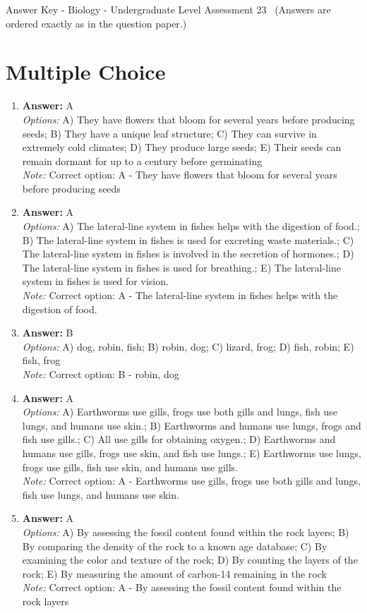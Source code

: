 \documentclass[12pt]{article}
\begin{document}
\begin{center}
Answer Key - Biology - Undergraduate Level Assessment 23 \
\small (Answers are ordered exactly as in the question paper.)
\end{center}

\section*{Multiple Choice}
\begin{enumerate}[label=\arabic*.]
\item \textbf{Answer:} A
\\ \textit{Options:} A) They have flowers that bloom for several years before producing seeds; B) They have a unique leaf structure; C) They can survive in extremely cold climates; D) They produce large seeds; E) Their seeds can remain dormant for up to a century before germinating
\\ \textit{Note:} Correct option: A - They have flowers that bloom for several years before producing seeds
\item \textbf{Answer:} A
\\ \textit{Options:} A) The lateral-line system in fishes helps with the digestion of food.; B) The lateral-line system in fishes is used for excreting waste materials.; C) The lateral-line system in fishes is involved in the secretion of hormones.; D) The lateral-line system in fishes is used for breathing.; E) The lateral-line system in fishes is used for vision.
\\ \textit{Note:} Correct option: A - The lateral-line system in fishes helps with the digestion of food.
\item \textbf{Answer:} B
\\ \textit{Options:} A) dog, robin, fish; B) robin, dog; C) lizard, frog; D) fish, robin; E) fish, frog
\\ \textit{Note:} Correct option: B - robin, dog
\item \textbf{Answer:} A
\\ \textit{Options:} A) Earthworms use gills, frogs use both gills and lungs, fish use lungs, and humans use skin.; B) Earthworms and humans use lungs, frogs and fish use gills.; C) All use gills for obtaining oxygen.; D) Earthworms and humans use gills, frogs use skin, and fish use lungs.; E) Earthworms use lungs, frogs use gills, fish use skin, and humans use gills.
\\ \textit{Note:} Correct option: A - Earthworms use gills, frogs use both gills and lungs, fish use lungs, and humans use skin.
\item \textbf{Answer:} A
\\ \textit{Options:} A) By assessing the fossil content found within the rock layers; B) By comparing the density of the rock to a known age database; C) By examining the color and texture of the rock; D) By counting the layers of the rock; E) By measuring the amount of carbon-14 remaining in the rock
\\ \textit{Note:} Correct option: A - By assessing the fossil content found within the rock layers
\end{enumerate}
\end{document}
